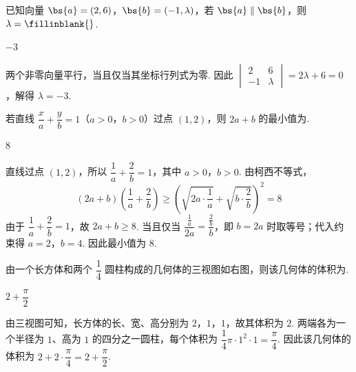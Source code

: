 \begin{problem}
已知向量 \(\bs{a}=(2,6)\)，\(\bs{b}=(-1,\lambda)\)，若 \(\bs{a}\parallel\bs{b}\)，则 \(\lambda=\fillinblank{}\).
\end{problem}

\begin{answer}
\(-3\)
\end{answer}

\begin{solution}
两个非零向量平行，当且仅当其坐标行列式为零. 因此
\(\begin{vmatrix}2&6\\-1&\lambda\end{vmatrix}=2\lambda+6=0\)，解得 \(\lambda=-3\).
\end{solution}

\begin{problem}
若直线 \(\dfrac{x}{a}+\dfrac{y}{b}=1\)（\(a>0\)，\(b>0\)）过点 \((1,2)\)，则 \(2a+b\) 的最小值为\fillinblank{}.
\end{problem}

\begin{answer}
8
\end{answer}

\begin{solution}
直线过点 \((1,2)\)，所以
\(\dfrac1a+\dfrac2b=1\)，其中 \(a>0\)，\(b>0\). 由柯西不等式，
\[
(2a+b)\left(\dfrac1a+\dfrac2b\right)
\geq\left(\sqrt{2a\cdot\dfrac1a}+\sqrt{b\cdot\dfrac2b}\right)^2=8
\]
由于 \(\dfrac1a+\dfrac2b=1\)，故 \(2a+b\geq8\). 当且仅当 \(\dfrac{\frac{1}{a}}{2a}=\dfrac{\frac{2}{b}}{b}\)，即 \(b=2a\) 时取等号；代入约束得 \(a=2\)，\(b=4\). 因此最小值为 \(8\).
\end{solution}

\begin{problem}
由一个长方体和两个 \(\dfrac14\) 圆柱构成的几何体的三视图如右图，则该几何体的体积为\fillinblank{}.

\end{problem}

\begin{answer}
\(2+\dfrac{\pi}{2}\)
\end{answer}

\begin{solution}
由三视图可知，长方体的长、宽、高分别为 \(2\)，\(1\)，\(1\)，故其体积为 \(2\). 两端各为一个半径为 \(1\)、高为 \(1\) 的四分之一圆柱，每个体积为 \(\dfrac14\pi\cdot1^2\cdot1=\dfrac\pi4\). 因此该几何体的体积为
\(2+2\cdot\dfrac\pi4=2+\dfrac\pi2\).
\end{solution}

